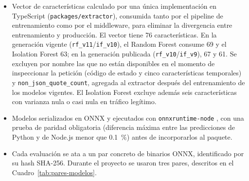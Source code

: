 \begin{itemize}
    \item Vector de características calculado por una única implementación en TypeScript
    (\texttt{packages/extractor}), consumida tanto por el pipeline de entrenamiento como por el
    middleware, para eliminar la divergencia entre entrenamiento y producción. El vector tiene 76
    características. En la generación vigente (\texttt{rf\_v11}/\texttt{if\_v10}), el Random Forest
    consume 69 y el Isolation Forest 63; en la generación publicada (\texttt{rf\_v10}/\texttt{if\_v9}),
    67 y 61. Se excluyen por nombre las que no están disponibles en el momento de inspeccionar la
    petición (código de estado y cinco características temporales) y
    \texttt{non\_json\_quote\_count}, agregada al extractor después del entrenamiento de los
    modelos vigentes. El Isolation Forest excluye además seis características con varianza nula o
    casi nula en tráfico legítimo.
    \item Modelos serializados en ONNX y ejecutados con \texttt{onnxruntime-node}
    \cite{onnxruntimedocs}, con una prueba de paridad obligatoria (diferencia máxima entre las
    predicciones de Python y de Node.js menor que 0.1~\%) antes de incorporarlos al paquete.
    \item Cada evaluación se ata a un par concreto de binarios ONNX, identificado por su hash
    SHA-256. Durante el proyecto se usaron tres pares, descritos en el
    Cuadro~\ref{tab:pares-modelos}.
\end{itemize}

